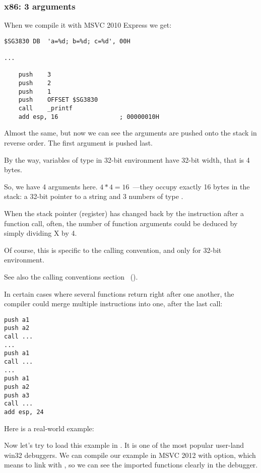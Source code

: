 \subsubsection{x86: 3 arguments}


When we compile it with MSVC 2010 Express we get:

\begin{lstlisting}
$SG3830	DB	'a=%d; b=%d; c=%d', 00H

...

	push	3
	push	2
	push	1
	push	OFFSET $SG3830
	call	_printf
	add	esp, 16					; 00000010H
\end{lstlisting}

Almost the same, but now we can see the \printf arguments are pushed onto the stack in reverse order. The first argument is pushed last.

By the way, variables of \Tint type in 32-bit environment have 32-bit width, that is 4 bytes.

So, we have 4 arguments here. $4*4 = 16$~---they occupy exactly 16 bytes in the stack: a 32-bit pointer to a string and 3 numbers of type \Tint.

When the \gls{stack pointer} (\ESP register) has changed back by the 
instruction after a function 
call, often, the number of function arguments could be deduced by simply dividing X by 4.

Of course, this is specific to the  calling convention, and only for 32-bit environment.

See also the calling conventions section ~().

In certain cases where several functions return right after one another, the compiler could merge multiple  instructions into one, after the last call:

\begin{lstlisting}
push a1
push a2
call ...
...
push a1
call ...
...
push a1
push a2
push a3
call ...
add esp, 24
\end{lstlisting}

Here is a real-world example:



\clearpage
{}
\myindex{\olly}

Now let's try to load this example in \olly.
It is one of the most popular user-land win32 debuggers.
We can compile our example in MSVC 2012 with  option, which means to link with ,
so we can see the imported functions clearly in the debugger.

